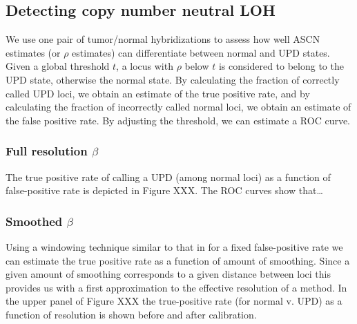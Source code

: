 \documentclass[10pt]{bmc_article}
\newenvironment{bmcformat}{\fussy\setboolean{publ}{true}}{\fussy}
\begin{document}
\begin{bmcformat}
\begin{center}
 \label{figROCs,chr18}
\end{center}


\subsection*{Detecting copy number neutral LOH}
We use one pair of tumor/normal hybridizations to assess how well ASCN estimates (or $\rho$ estimates) can differentiate between normal and UPD states. Given a global threshold $t$, a locus with $\rho$ below $t$ is considered to belong to the UPD state, otherwise the normal state. By calculating the fraction of correctly called UPD loci, we obtain an estimate of 
the true positive rate, and by calculating the fraction of incorrectly called normal loci, we obtain an estimate of the false positive rate. By adjusting the threshold, we can estimate a ROC curve. 

\subsubsection*{Full resolution $\beta$}
The true positive rate of calling a UPD (among normal loci) as a function of false-positive rate is depicted in Figure XXX. The ROC curves show that\dots

\subsubsection*{Smoothed $\beta$}
Using a windowing technique similar to that in \cite{BengtssonH_etal_2009b,BengtssonH_etal_2008a} for a fixed false-positive rate we can estimate the true positive rate as a function of amount of smoothing. Since a given amount of smoothing corresponds to a given distance between loci this provides us with a first approximation to the effective resolution of a method. In the upper panel of Figure XXX the true-positive rate (for normal v. UPD) as a function of resolution is shown before and after calibration.


\end{bmcformat}
\end{document}

